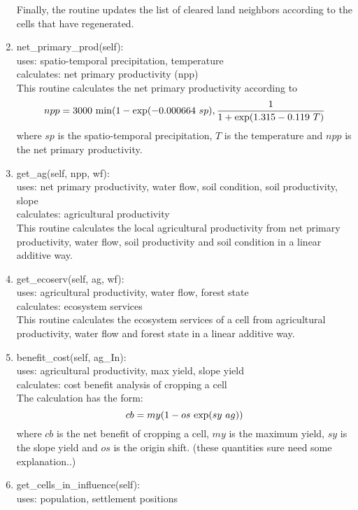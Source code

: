 \begin{enumerate}
		Finally, the routine updates the list of cleared land neighbors according to the cells that have regenerated.
	\item net_primary_prod(self):\\
		uses: spatio-temporal precipitation, temperature\\
		calculates: net primary productivity (npp)\\
		This routine calculates the net primary productivity according to 
		\begin{equation}
			npp = 3000 \ {\rm min}( 1 - {\rm exp}(-0.000664 \ sp), \frac{1}{1+{\rm exp}(1.315 - 0.119 \ T)}
			\label{npp}
		\end{equation}
		where $sp$ is the spatio-temporal precipitation, $T$ is the temperature and $npp$ is the net primary productivity.
	\item get_ag(self, npp, wf):\\
		uses: net primary productivity, water flow, soil condition, soil productivity, slope \\
		calculates: agricultural productivity\\
		This routine calculates the local agricultural productivity from net primary productivity, water flow, soil productivity and soil condition in a linear additive way.
	\item get_ecoserv(self, ag, wf):\\
		uses: agricultural productivity, water flow, forest state \\
		calculates: ecosystem services\\
		This routine calculates the ecosystem services of a cell from agricultural productivity, water flow and forest state in a linear additive way.
	\item benefit_cost(self, ag_In):\\
		uses: agricultural productivity, max yield, slope yield\\
		calculates: cost benefit analysis of cropping a cell\\
		The calculation has the form:
		\begin{equation}
			cb = my ( 1 - os \ {\rm exp}(sy \ ag) )
			\label{benefit_cost_analysis}
		\end{equation}
		where $cb$ is the net benefit of cropping a cell, $my$ is the maximum yield, $sy$ is the slope yield and $os$ is the origin shift.
		(these quantities sure need some explanation..)
	\item get_cells_in_influence(self):\\
		uses: population, settlement positions\\

\end{enumerate}
